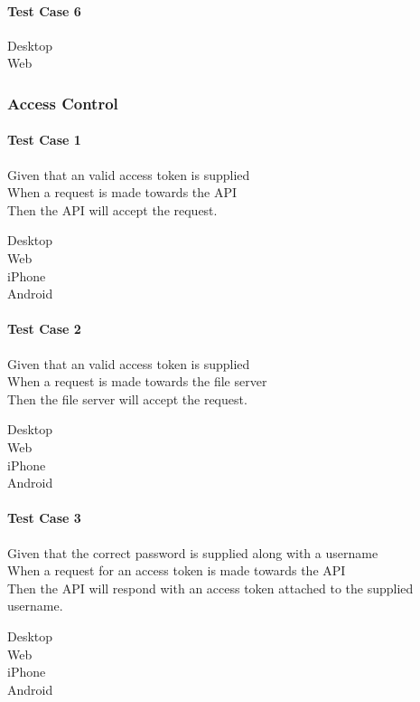 \paragraph*{Test Case 6}
\begin{description}
 \item[Desktop]
 \item[Web]
\end{description}


\subsubsection{Access Control}
\paragraph*{Test Case 1}
Given that an valid access token is supplied \\ When a request is made towards the API \\ Then the API will accept the request.
\begin{description}
 \item[Desktop]
 \item[Web]
 \item[iPhone] \cmark
 \item[Android]
\end{description}
\paragraph*{Test Case 2}
Given that an valid access token is supplied \\ When a request is made towards the file server \\ Then the file server will accept the request.
\begin{description}
 \item[Desktop]
 \item[Web]
 \item[iPhone] \cmark
 \item[Android]
\end{description}
\paragraph*{Test Case 3}
Given that the correct password is supplied along with a username \\ When a request for an access token is made towards the API \\ Then the API will respond with an access token attached to the supplied username.
\begin{description}
 \item[Desktop]
 \item[Web]
 \item[iPhone] \cmark
 \item[Android]
\end{description}


